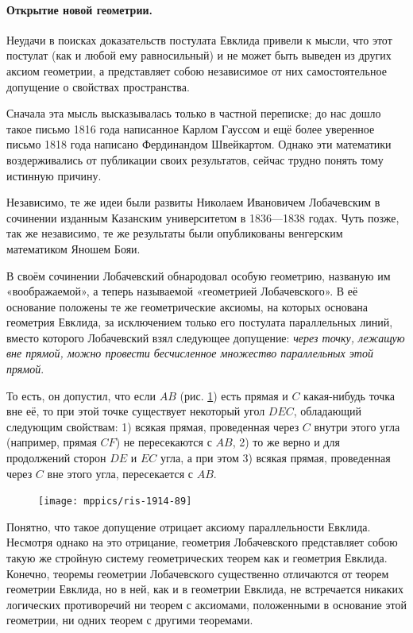 \documentclass[twoside]{book}
\begin{document}
\paragraph{Открытие новой геометрии.}\label{1914/93} Неудачи в поисках доказательств
постулата Евклида привели к мысли, что этот постулат (как и любой ему равносильный) и не может быть выведен из других аксиом геометрии, а представляет собою независимое от них самостоятельное допущение о свойствах пространства.

Сначала эта мысль высказывалась только в частной переписке;
до нас дошло такое письмо 1816 года написанное Карлом Гауссом
и ещё более уверенное письмо 1818 года написано Фердинандом Швейкартом.
Однако эти математики воздерживались от публикации своих результатов, сейчас трудно понять тому истинную причину.

Независимо, те же идеи были развиты Николаем Ивановичем Лобачевским в 
сочинении изданным Казанским университетом в 1836—1838 годах.
Чуть позже, так же независимо, те же результаты были опубликованы венгерским математиком Яношем Бояи.

В своём сочинении Лобачевский обнародовал особую геометрию, названую им «воображаемой», а теперь называемой «геометрией Лобачевского».
В её основание положены те же геометрические аксиомы, на которых основана
геометрия Евклида, за исключением только его постулата параллельных линий, вместо которого Лобачевский взял следующее допущение:
\emph{через точку, лежащую вне прямой, можно провести бесчисленное множество параллельных этой прямой}.


То есть, он допустил, что если $AB$ (рис. \ref{1914/ris-89}) есть прямая и $C$ какая-нибудь точка вне её, то при этой точке существует некоторый угол $DEC$, обладающий следующим свойствам:
1) всякая прямая, проведенная через $C$ внутри этого угла (например, прямая $CF$) не пересекаются с $AB$,
2) то же верно и для продолжений сторон $DE$ и $EC$ угла,
а при этом 3) всякая прямая, проведенная через $C$ вне этого угла, пересекается с $AB$.

\begin{figure}
\centering
\texttt{[image: mppics/ris-1914-89]}
\caption{}\label{1914/ris-89}
\end{figure}

Понятно, что такое допущение отрицает аксиому параллельности Евклида.
Несмотря однако на это отрицание, геометрия Лобачевского представляет собою такую же стройную
систему геометрических теорем как и геометрия Евклида.
Конечно, теоремы геометрии Лобачевского существенно отличаются от теорем геометрии Евклида, но
в ней, как и в геометрии Евклида, не встречается никаких логических противоречий ни теорем с аксиомами, положенными в основание этой геометрии, ни одних теорем с другими теоремами.
\end{document}
